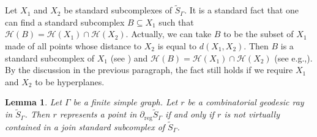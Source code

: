 \documentclass[11pt]{article}
\newcommand{\eg}{e.g.,\xspace}
\numberwithin{equation}{section}
\let\mathcal\mathscr
\theoremstyle{plain}
\newtheorem{lemma}[theo]{Lemma}
\theoremstyle{definition}
\newcommand{\calh}{\mathcal{H}}
\newcommand{\reg}{\mathrm{reg}}
\begin{document}
Let $X_1$ and $X_2$ be standard subcomplexes of $\widetilde{S}_\Gamma$. It is a standard fact that one can find a standard subcomplex $B\subseteq X_1$ such that $\calh(B)=\calh(X_1)\cap \calh(X_2)$. Actually, we can take $B$ to be the subset of $X_1$ made of all points whose distance to $X_2$ is equal to $d(X_1,X_2)$. Then $B$ is a standard subcomplex of $X_1$ (see \cite[Lem.\,3.1]{Hua}) and $\calh(B)=\calh(X_1)\cap \calh(X_2)$ (see \eg \cite[Lem.\,2.14]{Hua3}). By the discussion in the previous paragraph, the fact still holds if we require $X_1$ and $X_2$ to be hyperplanes.

\begin{lemma}\label{lem:join subgroup}
Let $\Gamma$ be a finite simple graph. Let $r$ be a combinatorial geodesic ray in $\widetilde{S}_\Gamma$. Then $r$ represents a point in $\partial_\reg\widetilde{S}_\Gamma$ if and only if $r$ is not virtually contained in a join standard subcomplex of $\widetilde{S}_\Gamma$.
\end{lemma}
\end{document}
